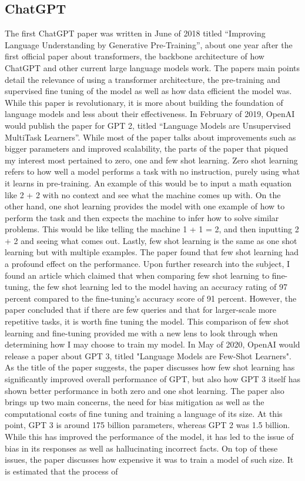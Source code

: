 \documentclass[10pt,twocolumn]{article}
\begin{document}
\subsection{ChatGPT}
The first ChatGPT paper was written in June of 2018 titled “Improving Language Understanding by Generative Pre-Training”\cite{radford_improving_nodate}, about one year after the first official paper about transformers, the  backbone architecture of how ChatGPT and other current large language models work. The papers main points detail the relevance of using a transformer architecture, the pre-training and supervised fine tuning of the model as well as how data efficient the model was. While this paper is revolutionary, it is more about building the foundation of language models and less about their effectiveness. In February of 2019, OpenAI would publish the paper for GPT 2, titled “Language Models are Unsupervised MultiTask Learners”\cite{radford_language_nodate}. While most of the paper talks about improvements such as bigger parameters and improved scalability, the parts of the paper that piqued my interest most pertained to zero, one and few shot learning. Zero shot learning refers to how well a model performs a task with no instruction, purely using what it learns in pre-training.  An example of this would be to input a math equation like 2 + 2 with no context and see what the machine comes up with. On the other hand, one shot learning provides the model with one example of how to perform the task and then expects the machine to infer how to solve similar problems. This would be like telling the machine 1 + 1 = 2, and then inputting 2 + 2 and seeing what comes out. Lastly, few shot learning is the same as one shot learning but with multiple examples. The paper found that few shot learning had a profound effect on the performance. Upon further research into the subject, I found an article which claimed that when comparing few shot learning to fine-tuning, the few shot learning led to the model having an accuracy rating of 97 percent compared to the fine-tuning’s accuracy score of 91 percent\cite{noauthor_zero-shot_nodate}. However, the paper concluded that if there are few queries and that for larger-scale more repetitive tasks, it is worth fine tuning the model. This comparison of few shot learning and fine-tuning provided me with a new lens to look through when determining how I may choose to train my model. In May of 2020, OpenAI would release a paper about GPT 3, titled "Language Models are Few-Shot Learners". As the title of the paper suggests, the paper discusses how few shot learning has significantly improved overall performance of GPT, but also how GPT 3 itself has shown better performance in both zero and one shot learning. The paper also brings up two main concerns, the need for bias mitigation as well as the computational costs of fine tuning and training a language of its size. At this point, GPT 3 is around 175 billion parameters, whereas GPT 2 was 1.5 billion. While this has improved the performance of the model, it has led to the issue of bias in its responses as well as hallucinating incorrect facts. On top of these issues, the paper discusses how expensive it was to train a model of such size. It is estimated that the process of 
\end{document}
